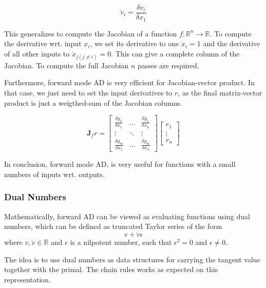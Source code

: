 \begin{equation}
    \dot{v}_i = \frac{\delta v_i}{\delta x_1}
\end{equation}

This generalizes to compute the Jacobian of a function $f: \mathbb{R}^n \xrightarrow{} \mathbb{R}$.
To compute the derivative wrt. input $x_i$, we set its derivative to one $\dot{x}_i = 1$ and the derivative of all other inputs to $\dot{x}_{j(j \ne i)} = 0$. This can give a complete column of the Jacobian. To compute the full Jacobian $n$ passes are required.

Furthermore, forward mode AD is very efficient for Jacobian-vector product. In that case, we just need to set the input derivatives to $r$, as the final matrix-vector product is just a weigthed-sum of the Jacobian columns.

\begin{equation}
    \mathbf{J}_f r = \left[\begin{array}{ccc}
        \frac{\delta y_1}{\delta x_1} & \hdots & \frac{\delta y_1}{\delta x_n}  \\
        \vdots & \ddots & \vdots \\
        \frac{\delta y_m}{\delta x_1} & \hdots & \frac{\delta y_m}{\delta x_n}
    \end{array}\right]
    \left[\begin{array}{c}
        r_1 \\
        \vdots \\
        r_n 
    \end{array}\right]
\end{equation}

In conclusion, forward mode AD, is very useful for functions with a small numbers of inputs wrt. outputs.



\subsubsection{Dual Numbers}
Mathematically, forward AD can be viewed as evaluating functions using dual numbers, which can be defined as truncated Taylor series of the form
\begin{equation}
    v + \dot{v}\epsilon
\end{equation}
where $v, \dot{v} \in \mathbb{R}$ and $\epsilon$ is a nilpotent number, such that $\epsilon^2 = 0$ and $\epsilon \ne 0$.

The idea is to use dual numbers as data structures for carrying the tangent value together with the primal.
The chain rules works as expected on this representation.


